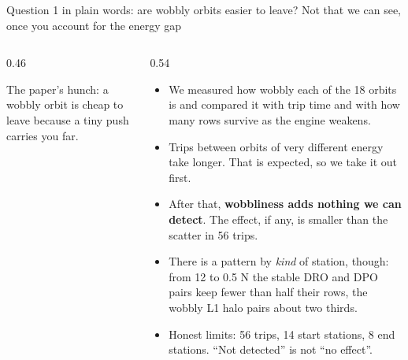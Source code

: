 \documentclass[aspectratio=169,10pt]{beamer}
\begin{document}
\begin{frame}{Question 1 in plain words: are wobbly orbits easier to leave? Not that we can see, once you account for the energy gap}
  \begin{columns}[T]
    \begin{column}{0.46\textwidth}
      \centering

      \vspace{4pt}
      {\footnotesize The paper's hunch: a wobbly orbit is cheap to leave because a tiny push carries you far.}
    \end{column}
    \begin{column}{0.54\textwidth}
      \small
      \begin{itemize}
        \setlength\itemsep{4pt}
        \item We measured how wobbly each of the 18 orbits is and compared it with trip time and with how many rows survive as the engine weakens.
        \item Trips between orbits of very different energy take longer. That is expected, so we take it out first.
        \item After that, \textbf{wobbliness adds nothing we can detect}. The effect, if any, is smaller than the scatter in 56 trips.
        \item There is a pattern by \emph{kind} of station, though: from 12 to 0.5 N the stable DRO and DPO pairs keep fewer than half their rows, the wobbly L1 halo pairs about two thirds.
        \item Honest limits: 56 trips, 14 start stations, 8 end stations. ``Not detected'' is not ``no effect''.
      \end{itemize}
    \end{column}
  \end{columns}
\end{frame}
\end{document}
